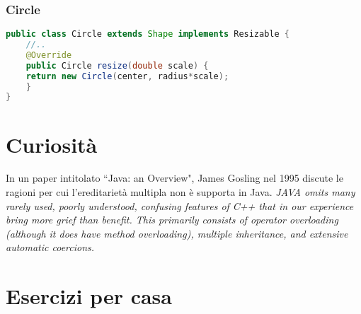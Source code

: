 \documentclass{article}
\begin{document}
\subsubsection{Circle}



\begin{lstlisting}[language=Java,escapechar=|]
public class Circle extends Shape implements Resizable { 
    //..
    @Override
    public Circle resize(double scale) {
    return new Circle(center, radius*scale);
    }
}
\end{lstlisting}

\section{Curiosit\`a}
\begin{framed}
In un paper intitolato ``Java: an Overview", James Gosling nel 1995 discute le ragioni per cui l'ereditariet\`a multipla non \`e supporta in Java.
\emph{JAVA omits many rarely used, poorly understood, confusing features of C++ that in our experience bring more grief than benefit. This primarily consists of operator overloading (although it does have method overloading), multiple inheritance, and extensive automatic coercions.}
\end{framed}

\section{Esercizi per casa}
\end{document}
